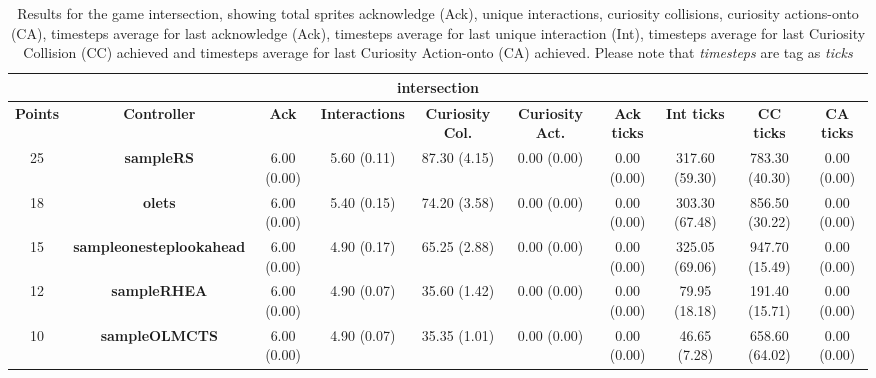 \begin{table*}[!t]
\begin{center}
\begin{adjustbox}{width=1\textwidth}
\begin{tabular}{|c|c|c|c|c|c|c|c|c|c|}
\multicolumn{10}{c}{\textbf{intersection}}\\
\hline
\textbf{Points} & \textbf{Controller} & \textbf{Ack} & \textbf{Interactions} & \textbf{Curiosity Col.} & \textbf{Curiosity Act.} & \textbf{Ack ticks} & \textbf{Int ticks} & \textbf{CC ticks} & \textbf{CA ticks}\\
\hline
25 & \textbf{sampleRS} & 6.00 (0.00) & 5.60 (0.11) & 87.30 (4.15) & 0.00 (0.00) & 0.00 (0.00) & 317.60 (59.30) & 783.30 (40.30) & 0.00 (0.00)
 \\
\hline
18 & \textbf{olets} & 6.00 (0.00) & 5.40 (0.15) & 74.20 (3.58) & 0.00 (0.00) & 0.00 (0.00) & 303.30 (67.48) & 856.50 (30.22) & 0.00 (0.00)
 \\
\hline
15 & \textbf{sampleonesteplookahead} & 6.00 (0.00) & 4.90 (0.17) & 65.25 (2.88) & 0.00 (0.00) & 0.00 (0.00) & 325.05 (69.06) & 947.70 (15.49) & 0.00 (0.00)
 \\
\hline
12 & \textbf{sampleRHEA} & 6.00 (0.00) & 4.90 (0.07) & 35.60 (1.42) & 0.00 (0.00) & 0.00 (0.00) & 79.95 (18.18) & 191.40 (15.71) & 0.00 (0.00)
 \\
\hline
10 & \textbf{sampleOLMCTS} & 6.00 (0.00) & 4.90 (0.07) & 35.35 (1.01) & 0.00 (0.00) & 0.00 (0.00) & 46.65 (7.28) & 658.60 (64.02) & 0.00 (0.00)
 \\
\hline
\end{tabular}
\end{adjustbox}
\caption{Results for the game intersection, showing total sprites acknowledge (Ack), unique interactions, curiosity collisions, curiosity actions-onto (CA), timesteps average for last acknowledge (Ack),  timesteps average for last unique interaction (Int), timesteps average for last Curiosity Collision (CC) achieved and timesteps average for last Curiosity Action-onto (CA) achieved. Please note that \textit{timesteps} are tag as \textit{ticks}}
\label{tab:weights}
\end{center}
\end{table*}
